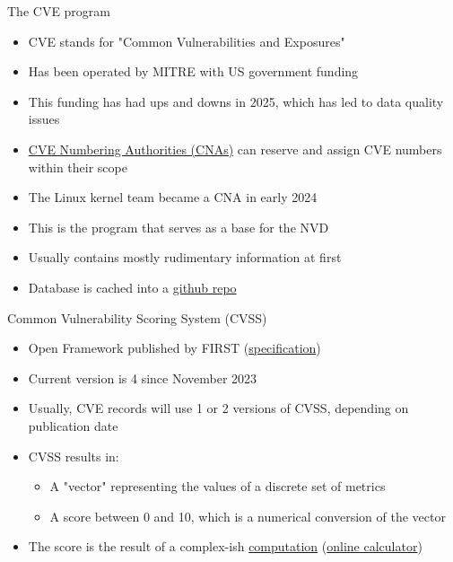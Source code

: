 \begin{frame}{The CVE program}
  \begin{itemize}
    \item CVE stands for "Common Vulnerabilities and Exposures"
    \item Has been operated by MITRE with US government funding
    \item This funding has had ups and downs in 2025, which has led to data quality issues
    \item \href{https://www.cve.org/programorganization/cnas}{CVE Numbering Authorities (CNAs)}
          can reserve and assign CVE numbers within their scope
    \item The Linux kernel team became a CNA in early 2024
    \item This is the program that serves as a base for the NVD
    \item Usually contains mostly rudimentary information at first
    \item Database is cached into a \href{https://github.com/CVEProject/cvelistV5}{github repo}
  \end{itemize}
\end{frame}

\begin{frame}{Common Vulnerability Scoring System (CVSS)}
  \begin{itemize}
    \item Open Framework published by FIRST
          (\href{https://www.first.org/cvss/specification-document}{specification})
    \item Current version is 4 since November 2023
    \item Usually, CVE records will use 1 or 2 versions of CVSS, depending on publication date
    \item CVSS results in:
    \begin{itemize}
      \item A "vector" representing the values of a discrete set of metrics
      \item A score between 0 and 10, which is a numerical conversion of the vector
    \end{itemize}
    \item The score is the result of a complex-ish
          \href{https://github.com/FIRSTdotorg/cvss-v4-calculator}{computation}
          (\href{https://redhatproductsecurity.github.io/cvss-v4-calculator/}{online calculator})
  \end{itemize}
\end{frame}

